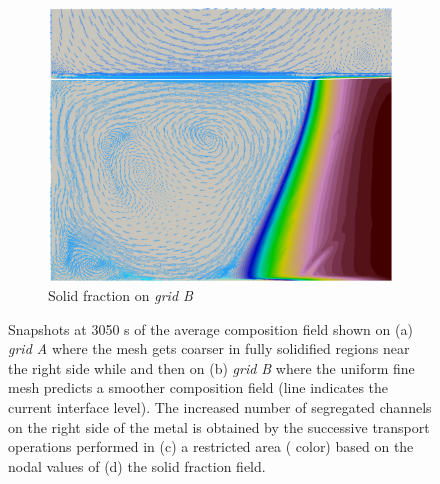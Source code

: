 \begin{figure}[H]
\begin{subfigure}[t]{0.4\textwidth}
  \includegraphics[width=\textwidth]{Chapter5/Graphics/2d/processed/1200s_gs_vl.png}
  \caption{Solid fraction on \emph{grid B}}
    \label{fig:1200s_gs}
  \end{subfigure}
\caption{Snapshots at 3050 s of the average composition field shown on 
(a) \emph{grid A} where the mesh gets coarser in fully solidified regions near the right side while
and then on 
(b) \emph{grid B} where the uniform fine mesh predicts a smoother composition field (line indicates the current interface level). 
The increased number of segregated channels on the right side of the
metal is obtained by the successive transport operations performed in 
(c) a restricted area ( color) based on the nodal values of (d) the solid fraction field.}
\label{fig:W_mask_1200s}
\end{figure}

